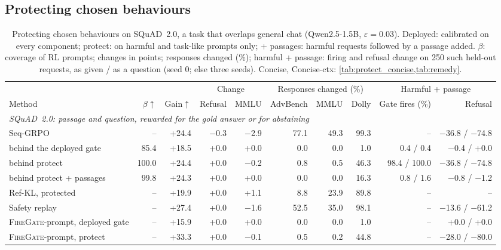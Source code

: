 \documentclass{article}
\theoremstyle{plain}
\theoremstyle{definition}
\theoremstyle{remark}
\newcommand{\methodp}{\textsc{FireGate}-prompt}
\begin{document}
\subsection{Protecting chosen behaviours}
\label{sec:res-protect}\label{sec:res-limit}

\begin{table}[t]
\centering
\footnotesize
\setlength{\tabcolsep}{3.2pt}
\caption{Protecting chosen behaviours on SQuAD~2.0, a task that overlaps general chat (Qwen2.5-1.5B,
$\varepsilon=0.03$). Deployed: calibrated on every component; protect: on harmful and task-like prompts only;
+ passages: harmful requests followed by a passage added. $\beta$: coverage of RL prompts; changes in points;
responses changed (\%); harmful + passage: firing and refusal change on 250 such held-out requests, as given / as a
question (seed 0; else three seeds). Concise, Concise-ctx: \cref{tab:protect_concise,tab:remedy}.}
\label{tab:protect}
\begin{tabular}{l r r rr rrr rr}
\toprule
 & & & \multicolumn{2}{c}{Change} & \multicolumn{3}{c}{Responses changed (\%)} & \multicolumn{2}{c}{Harmful + passage} \\
\cmidrule(lr){4-5}\cmidrule(lr){6-8}\cmidrule(lr){9-10}
Method & $\beta\uparrow$ & Gain$\uparrow$ & Refusal & MMLU & AdvBench & MMLU & Dolly & Gate fires (\%) & Refusal \\
\midrule
\multicolumn{10}{l}{\emph{SQuAD~2.0: passage and question, rewarded for the gold answer or for abstaining}} \\
Seq-GRPO & -- & +24.4 & $-$0.3 & $-$2.9 & 77.1 & 49.3 & 99.3 & -- & $-$36.8 / $-$74.8 \\
\quad behind the deployed gate & 85.4 & +18.5 & +0.0 & +0.0 & 0.0 & 0.0 & 1.0 & 0.4 / 0.4 & $-$0.4 / +0.0 \\
\quad behind protect & 100.0 & +24.4 & +0.0 & $-$0.2 & 0.8 & 0.5 & 46.3 & 98.4 / 100.0 & $-$36.8 / $-$74.8 \\
\quad behind protect + passages & 99.8 & +24.3 & +0.0 & +0.0 & 0.0 & 0.0 & 16.3 & 0.8 / 1.6 & $-$0.8 / $-$1.2 \\
Ref-KL, protected & -- & +19.9 & +0.0 & +1.1 & 8.8 & 23.9 & 89.8 & -- & -- \\
Safety replay & -- & +27.4 & +0.0 & $-$1.6 & 52.5 & 35.0 & 98.1 & -- & $-$13.6 / $-$61.2 \\
\methodp{}, deployed gate & -- & +15.9 & +0.0 & +0.0 & 0.0 & 0.0 & 1.0 & -- & +0.0 / +0.0 \\
\methodp{}, protect & -- & +33.3 & +0.0 & $-$0.1 & 0.5 & 0.2 & 44.8 & -- & $-$28.0 / $-$80.0 \\
\bottomrule
\end{tabular}
\end{table}
\end{document}
